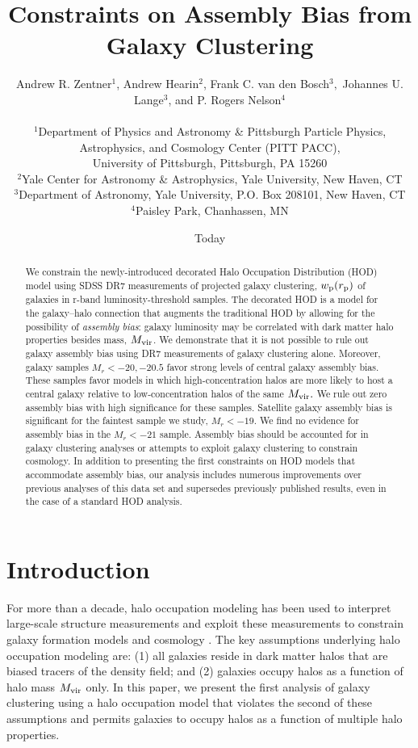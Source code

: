 \documentclass[usenatbib,usegraphicx,letterpaper]{mn2e}
\title[Clustering Constraints on Assembly Bias]
{
Constraints on Assembly Bias from Galaxy Clustering
}
\author[Zentner et al.]
{Andrew R. Zentner$^{1}$, Andrew Hearin$^{2}$, Frank C. van den Bosch$^{3},$ \newauthor
Johannes U. Lange$^{3}$, and P. Rogers Nelson$^{4}$\\ \\
$^1$Department of Physics and Astronomy \& Pittsburgh Particle Physics, Astrophysics, and Cosmology Center (PITT PACC),\\ University of Pittsburgh, Pittsburgh, PA 15260\\
$^2$Yale Center for Astronomy \& Astrophysics, Yale University, New Haven, CT\\
$^3$Department of Astronomy, Yale University, P.O. Box 208101, New Haven, CT\\
$^4$Paisley Park, Chanhassen, MN\\
}
\date{Today}
\newcommand{\mvir}{M_{\rm vir}}
\newcommand{\wprp}{w_{\mathrm{p}}}
\newcommand{\magr}{M_r}
\begin{document}
\maketitle
\begin{abstract}
  We constrain the newly-introduced decorated Halo Occupation Distribution (HOD) 
  model using SDSS DR7 measurements of projected galaxy clustering, $\wprp (r_{\rm p})$ 
  of galaxies in r-band luminosity-threshold samples. 
  The decorated HOD is a model for the galaxy--halo
  connection that augments the traditional HOD by allowing for the possibility of 
  {\em assembly bias}: galaxy luminosity may be correlated with dark matter halo
  properties besides mass, $\mvir$. We demonstrate that it
  is not possible to rule out galaxy assembly bias using DR7 measurements of galaxy 
  clustering alone. Moreover, galaxy samples $\magr<-20, -20.5$
  favor strong levels of central galaxy assembly bias. These samples favor models 
  in which high-concentration halos are more likely to host a central galaxy
  relative to low-concentration halos of the same $\mvir.$ We rule out
  zero assembly bias with high significance for these
  samples. Satellite galaxy assembly bias is significant for the
  faintest sample we study, $\magr<-19.$ We find no evidence for
  assembly bias in the $\magr<-21$ sample. Assembly bias should be accounted for 
  in galaxy clustering analyses or attempts to exploit galaxy clustering to constrain cosmology. 
  In addition to presenting the first constraints on HOD models that accommodate assembly bias, our analysis 
  includes numerous improvements over previous analyses of this data set and 
  supersedes previously published results, even in the case of a standard HOD analysis.
\end{abstract}

\section{Introduction}
\label{section:introduction}

For more than a decade, halo occupation modeling has been used to
interpret large-scale structure measurements and exploit these
measurements to constrain galaxy formation models and cosmology
\citep[e.g.,][]{yang03,tinker05,zehavi05a,
  porciani06,vdBosch07,Zheng07,conroy_wechsler09,yang09b,zehavi_etal11,guo_etal11b,
  wake_etal11,yang11a,yang12,leauthaud_etal12,rod_puebla12,tinker_etal13,cacciato_etal13,
  more_etal13,guo_etal14,zu_mandelbaum15b}. The key assumptions
underlying halo occupation modeling are: (1) all galaxies reside in
dark matter halos that are biased tracers of the density field; and
(2) galaxies occupy halos as a function of halo mass $\mvir$ only. 
In this paper, we present the first analysis of galaxy clustering using 
a halo occupation model that violates the second of these assumptions 
and permits galaxies to occupy halos as a function of multiple halo properties.
\end{document}
